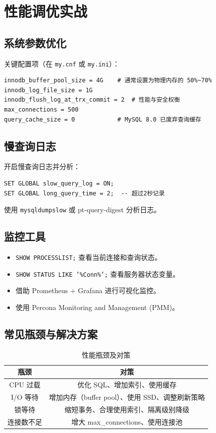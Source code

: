 \documentclass[12pt,UTF8]{ctexbook}
\begin{document}
\chapter{性能调优实战}
\label{ch:tuning}

\section{系统参数优化}

关键配置项（在 \texttt{my.cnf} 或 \texttt{my.ini}）：

\begin{lstlisting}
innodb_buffer_pool_size = 4G    # 通常设置为物理内存的 50%~70%
innodb_log_file_size = 1G
innodb_flush_log_at_trx_commit = 2  # 性能与安全权衡
max_connections = 500
query_cache_size = 0            # MySQL 8.0 已废弃查询缓存
\end{lstlisting}

\section{慢查询日志}

开启慢查询日志并分析：

\begin{lstlisting}
SET GLOBAL slow_query_log = ON;
SET GLOBAL long_query_time = 2;  -- 超过2秒记录
\end{lstlisting}

使用 \texttt{mysqldumpslow} 或 pt-query-digest 分析日志。

\section{监控工具}

\begin{itemize}
  \item \texttt{SHOW PROCESSLIST;} 查看当前连接和查询状态。
  \item \texttt{SHOW STATUS LIKE '\%Conn\%';} 查看服务器状态变量。
  \item 借助 Prometheus + Grafana 进行可视化监控。
  \item 使用 Percona Monitoring and Management (PMM)。
\end{itemize}

\section{常见瓶颈与解决方案}

\begin{table}[htbp]
\centering
\caption{性能瓶颈及对策}
\begin{tabular}{|c|c|}
\hline
\textbf{瓶颈} & \textbf{对策} \\
\hline
CPU 过载 & 优化 SQL、增加索引、使用缓存 \\
\hline
I/O 等待 & 增加内存（buffer pool）、使用 SSD、调整刷新策略 \\
\hline
锁等待 & 缩短事务、合理使用索引、隔离级别降级 \\
\hline
连接数不足 & 增大 max\_connections、使用连接池 \\
\hline
\end{tabular}
\end{table}
\end{document}

